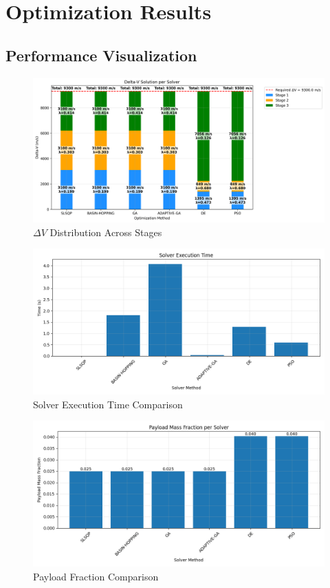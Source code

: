 \documentclass{article}
\begin{document}
\section{Optimization Results}
\subsection{Performance Visualization}
\begin{figure}[H]
\centering
\includegraphics[width=1.2\textwidth]{dv_breakdown.png}
\caption{$\Delta V$ Distribution Across Stages}
\end{figure}

\begin{figure}[H]
\centering
\includegraphics[width=\textwidth]{execution_time.png}
\caption{Solver Execution Time Comparison}
\end{figure}

\begin{figure}[H]
\centering
\includegraphics[width=\textwidth]{payload_fraction.png}
\caption{Payload Fraction Comparison}
\end{figure}
\end{document}
